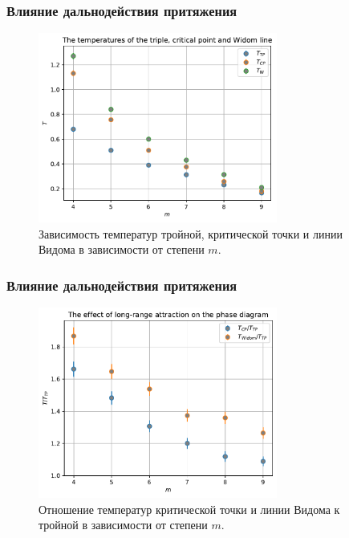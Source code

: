 \documentclass[pdf,hyperref={unicode}]{beamer}
\begin{document}
\begin{frame}
\transdissolve[duration=0.2]
\frametitle{Влияние дальнодействия притяжения}

\begin{figure}[h]
\begin{center}
\includegraphics[width=0.7\textwidth]{temperatures_triple_critical_Widom}
\caption{ \tiny Зависимость температур тройной, критической точки и линии Видома в зависимости от степени $m$.}
\label{risTcpTtp}
\end{center}
\end{figure}

\end{frame}





\begin{frame}
\transdissolve[duration=0.2]
\frametitle{Влияние дальнодействия притяжения}

\begin{figure}[h]
\begin{center}
\includegraphics[width=0.7\textwidth]{effect_of_long-range_attraction}
\caption{\tiny Отношение температур критической точки и линии Видома к тройной в зависимости от степени $m$.}
\label{risTcpTtpWidoml}
\end{center}
\end{figure}

\end{frame}
\end{document}
